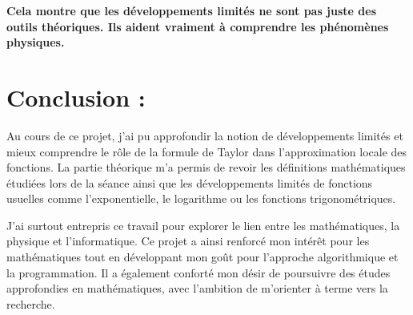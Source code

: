 \documentclass{article}
\begin{document}
\textbf{Cela montre que les développements limités ne sont pas juste des outils théoriques. Ils aident vraiment à comprendre les phénomènes physiques.}





\section{Conclusion :}

Au cours de ce projet, j’ai pu approfondir la notion de développements limités et mieux comprendre le rôle de la formule de Taylor dans l’approximation locale des fonctions. La partie théorique m’a permis de revoir les définitions mathématiques étudiées lors de la séance ainsi que les développements limités de fonctions usuelles comme l’exponentielle, le logarithme ou les fonctions trigonométriques.

J’ai surtout entrepris ce travail pour explorer le lien entre les mathématiques, la physique et l’informatique. Ce projet a ainsi renforcé mon intérêt pour les mathématiques tout en développant mon goût pour l’approche algorithmique et la programmation. Il a également conforté mon désir de poursuivre des études approfondies en mathématiques, avec l’ambition de m’orienter à terme vers la recherche.
\end{document}
